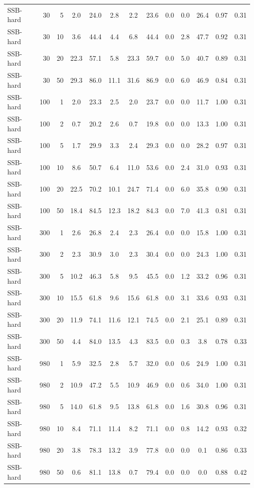 {\begin{tabular}{@{}lrr|ccc|cc|ccccc@{}}
SSB-hard & 30 & 5 & 2.0 & 24.0 & 2.8 & 2.2 & 23.6 & 0.0 & 0.0 & 26.4 & 0.97 & 0.31 \\
SSB-hard & 30 & 10 & 3.6 & 44.4 & 4.4 & 6.8 & 44.4 & 0.0 & 2.8 & 47.7 & 0.92 & 0.31 \\
SSB-hard & 30 & 20 & 22.3 & 57.1 & 5.8 & 23.3 & 59.7 & 0.0 & 5.0 & 40.7 & 0.89 & 0.31 \\
SSB-hard & 30 & 50 & 29.3 & 86.0 & 11.1 & 31.6 & 86.9 & 0.0 & 6.0 & 46.9 & 0.84 & 0.31 \\
SSB-hard & 100 & 1 & 2.0 & 23.3 & 2.5 & 2.0 & 23.7 & 0.0 & 0.0 & 11.7 & 1.00 & 0.31 \\
SSB-hard & 100 & 2 & 0.7 & 20.2 & 2.6 & 0.7 & 19.8 & 0.0 & 0.0 & 13.3 & 1.00 & 0.31 \\
SSB-hard & 100 & 5 & 1.7 & 29.9 & 3.3 & 2.4 & 29.3 & 0.0 & 0.0 & 28.2 & 0.97 & 0.31 \\
SSB-hard & 100 & 10 & 8.6 & 50.7 & 6.4 & 11.0 & 53.6 & 0.0 & 2.4 & 31.0 & 0.93 & 0.31 \\
SSB-hard & 100 & 20 & 22.5 & 70.2 & 10.1 & 24.7 & 71.4 & 0.0 & 6.0 & 35.8 & 0.90 & 0.31 \\
SSB-hard & 100 & 50 & 18.4 & 84.5 & 12.3 & 18.2 & 84.3 & 0.0 & 7.0 & 41.3 & 0.81 & 0.31 \\
SSB-hard & 300 & 1 & 2.6 & 26.8 & 2.4 & 2.3 & 26.4 & 0.0 & 0.0 & 15.8 & 1.00 & 0.31 \\
SSB-hard & 300 & 2 & 2.3 & 30.9 & 3.0 & 2.3 & 30.4 & 0.0 & 0.0 & 24.3 & 1.00 & 0.31 \\
SSB-hard & 300 & 5 & 10.2 & 46.3 & 5.8 & 9.5 & 45.5 & 0.0 & 1.2 & 33.2 & 0.96 & 0.31 \\
SSB-hard & 300 & 10 & 15.5 & 61.8 & 9.6 & 15.6 & 61.8 & 0.0 & 3.1 & 33.6 & 0.93 & 0.31 \\
SSB-hard & 300 & 20 & 11.9 & 74.1 & 11.6 & 12.1 & 74.5 & 0.0 & 2.1 & 25.1 & 0.89 & 0.31 \\
SSB-hard & 300 & 50 & 4.4 & 84.0 & 13.5 & 4.3 & 83.5 & 0.0 & 0.3 & 3.8 & 0.78 & 0.33 \\
SSB-hard & 980 & 1 & 5.9 & 32.5 & 2.8 & 5.7 & 32.0 & 0.0 & 0.6 & 24.9 & 1.00 & 0.31 \\
SSB-hard & 980 & 2 & 10.9 & 47.2 & 5.5 & 10.9 & 46.9 & 0.0 & 0.6 & 34.0 & 1.00 & 0.31 \\
SSB-hard & 980 & 5 & 14.0 & 61.8 & 9.5 & 13.8 & 61.8 & 0.0 & 1.6 & 30.8 & 0.96 & 0.31 \\
SSB-hard & 980 & 10 & 8.4 & 71.1 & 11.4 & 8.2 & 71.1 & 0.0 & 0.8 & 14.2 & 0.93 & 0.32 \\
SSB-hard & 980 & 20 & 3.8 & 78.3 & 13.2 & 3.9 & 77.8 & 0.0 & 0.0 & 0.1 & 0.86 & 0.33 \\
SSB-hard & 980 & 50 & 0.6 & 81.1 & 13.8 & 0.7 & 79.4 & 0.0 & 0.0 & 0.0 & 0.88 & 0.42 \\
\hline
\end{tabular}}%
